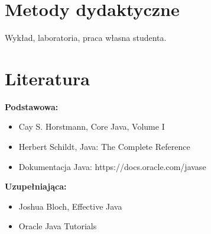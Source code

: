 \documentclass[12pt, a4paper]{article}
\begin{document}
\section{Metody dydaktyczne}

Wykład, laboratoria, praca własna studenta.

\section{Literatura}

\textbf{Podstawowa:}
\begin{itemize}
  \item Cay S. Horstmann, Core Java, Volume I
  \item Herbert Schildt, Java: The Complete Reference
  \item Dokumentacja Java: https://docs.oracle.com/javase
\end{itemize}

\textbf{Uzupełniająca:}
\begin{itemize}
  \item Joshua Bloch, Effective Java
  \item Oracle Java Tutorials
\end{itemize}
\end{document}
